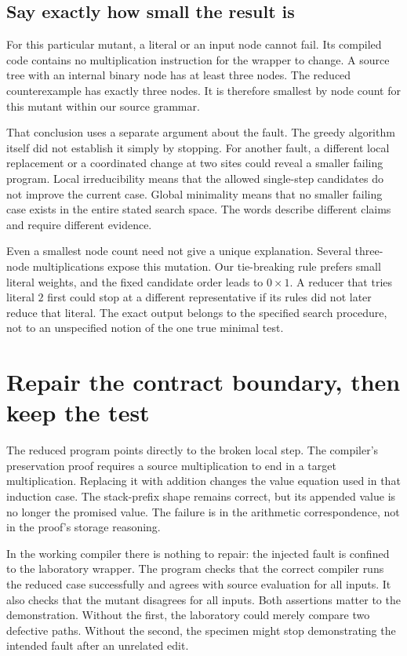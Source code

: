 \subsection{Say exactly how small the result is}
\label{sec:tiny-reducer-minimality}

For this particular mutant, a literal or an input node cannot fail.
Its compiled code contains no multiplication instruction for the wrapper to change.
A source tree with an internal binary node has at least three nodes.
The reduced counterexample has exactly three nodes.
It is therefore smallest by node count for this mutant within our source grammar.

That conclusion uses a separate argument about the fault.
The greedy algorithm itself did not establish it simply by stopping.
For another fault, a different local replacement or a coordinated change at two sites could reveal a smaller failing program.
Local irreducibility means that the allowed single-step candidates do not improve the current case.
Global minimality means that no smaller failing case exists in the entire stated search space.
The words describe different claims and require different evidence.

Even a smallest node count need not give a unique explanation.
Several three-node multiplications expose this mutation.
Our tie-breaking rule prefers small literal weights, and the fixed candidate order leads to $0\times1$.
A reducer that tries literal $2$ first could stop at a different representative if its rules did not later reduce that literal.
The exact output belongs to the specified search procedure, not to an unspecified notion of the one true minimal test.

\section{Repair the contract boundary, then keep the test}
\label{sec:tiny-fault-regression}

The reduced program points directly to the broken local step.
The compiler's preservation proof requires a source multiplication to end in a target multiplication.
Replacing it with addition changes the value equation used in that induction case.
The stack-prefix shape remains correct, but its appended value is no longer the promised value.
The failure is in the arithmetic correspondence, not in the proof's storage reasoning.

In the working compiler there is nothing to repair: the injected fault is confined to the laboratory wrapper.
The program checks that the correct compiler runs the reduced case successfully and agrees with source evaluation for all inputs.
It also checks that the mutant disagrees for all inputs.
Both assertions matter to the demonstration.
Without the first, the laboratory could merely compare two defective paths.
Without the second, the specimen might stop demonstrating the intended fault after an unrelated edit.

